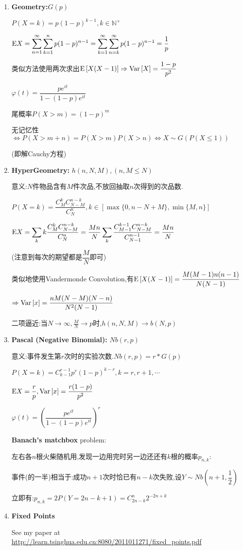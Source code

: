 \begin{enumerate}
    \item \textbf{Geometry:}$ G(p)$

      $ P(X=k) = p(1-p)^{k-1}, k \in \mathbb{N^+}$

      $ \Ex{X} = \sum_{n=1}^{\infty}\sum_{k=1}^{n}{p(1-p)^{n-1}}=
      \sum_{k=1}^{\infty}\sum_{n=k}^{\infty}{p(1-p)^{n-1}}= \dfrac{1}{p}$

      类似方法使用两次求出$ \text{E}\left[X(X-1)\right]\Rightarrow \text{Var}\left[X\right] = \dfrac{1-p}{p^2}$

      $ \varphi(t) = \dfrac{pe^{it}}{1-(1-p)e^{it}}$

      尾概率$ P(X>m) = (1-p)^m$

      无记忆性 $\Leftrightarrow P(X>m+n) = P(X>m)P(X>n)\Leftrightarrow X\sim G(P(X\le 1)) $

          (即解Cauchy方程)

        \item \textbf{HyperGeometry:} $ h(n,N,M),(n, M\le N)$

          意义:$ N$件物品含有$ M$件次品,不放回抽取$ n$次得到的次品数.

          $ P(X=k) = \dfrac{C_M^kC_{N-M}^{n-k}}{C_N^n}, k \in [\max\{0, n-N + M\}, \min\{M,n\}]$

          $ \Ex{X} = \sum_{k}{k\dfrac{C_M^kC_{N-M}^{n-k}}{C_N^n}}  = \dfrac{Mn}{N}\sum_{k}{\dfrac{C_{M-1}^{k-1}C_{N-M}^{n-k}}{C_{N-1}^{n-1}}} = \dfrac{Mn}{N}$

          (注意到每次的期望都是$ \dfrac{M}{N}$即可)

          类似地使用Vandermonde Convolution,有$ 	\text{E}\left[X(X-1)\right] = \dfrac{M(M-1)n(n-1)}{N(N-1)}$

          $\Rightarrow \text{Var}\left[x\right]  = \dfrac{nM(N-M)(N-n)}{N^2(N-1)} $

        二项逼近:当$N\to\infty, \frac{M}{N}\to p $时,$ h(n,N,M)\to b(N,p)$

      \item \textbf{Pascal (Negative Binomial):} $ Nb(r,p)$

        意义:事件发生第$ r$次时的实验次数.$ Nb(r, p) = r * G(p) $

        $ P(X = k) = C_{k-1}^{r-1}p^r(1-p)^{k-r}, k = r,r+1,\cdots$

        $ \text{E}X = \dfrac{r}{p}, \text{Var}\left[x\right] = \dfrac{r(1-p)}{p^2}$

        $ \varphi(t) = (\dfrac{pe^{it}}{1-(1-p)e^{it}})^r$

        \textbf{Banach's matchbox} problem:

        左右各$ n$根火柴随机用,发现一边用完时另一边还还有$ k$根的概率$ p_{n,k}$:

        事件(的一半)相当于:成功$ n+1$次时恰已有$ n-k$次失败,设$ Y\sim Nb(n+1, \dfrac{1}{2})$

        立即有:$ p_{n,k} = 2P(Y = 2n-k+1) = C_{2n-k}^{n}2^{-2n+k}$

      \item \textbf{Fixed Points}

        See my paper at \url{http://learn.tsinghua.edu.cn:8080/2011011271/fixed_points.pdf}

    \end{enumerate}
